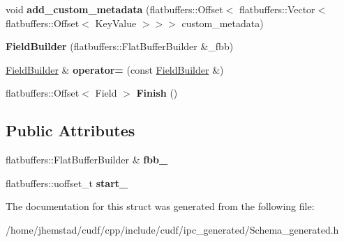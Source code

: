 \begin{DoxyCompactItemize}
\item 
void {\bfseries add\+\_\+custom\+\_\+metadata} (flatbuffers\+::\+Offset$<$ flatbuffers\+::\+Vector$<$ flatbuffers\+::\+Offset$<$ Key\+Value $>$$>$$>$ custom\+\_\+metadata)\hypertarget{structorg_1_1apache_1_1arrow_1_1flatbuf_1_1FieldBuilder_aab60afc5059e350c19c069a3e72563a3}{}\label{structorg_1_1apache_1_1arrow_1_1flatbuf_1_1FieldBuilder_aab60afc5059e350c19c069a3e72563a3}

\item 
{\bfseries Field\+Builder} (flatbuffers\+::\+Flat\+Buffer\+Builder \&\+\_\+fbb)\hypertarget{structorg_1_1apache_1_1arrow_1_1flatbuf_1_1FieldBuilder_acfb2eecaf9856b74b2bba5214c745767}{}\label{structorg_1_1apache_1_1arrow_1_1flatbuf_1_1FieldBuilder_acfb2eecaf9856b74b2bba5214c745767}

\item 
\hyperlink{structorg_1_1apache_1_1arrow_1_1flatbuf_1_1FieldBuilder}{Field\+Builder} \& {\bfseries operator=} (const \hyperlink{structorg_1_1apache_1_1arrow_1_1flatbuf_1_1FieldBuilder}{Field\+Builder} \&)\hypertarget{structorg_1_1apache_1_1arrow_1_1flatbuf_1_1FieldBuilder_a979b735cd740c5d157d0542afe1feda1}{}\label{structorg_1_1apache_1_1arrow_1_1flatbuf_1_1FieldBuilder_a979b735cd740c5d157d0542afe1feda1}

\item 
flatbuffers\+::\+Offset$<$ Field $>$ {\bfseries Finish} ()\hypertarget{structorg_1_1apache_1_1arrow_1_1flatbuf_1_1FieldBuilder_a9d2d6881f6a6503e56b90d4081a343b6}{}\label{structorg_1_1apache_1_1arrow_1_1flatbuf_1_1FieldBuilder_a9d2d6881f6a6503e56b90d4081a343b6}

\end{DoxyCompactItemize}
\subsection*{Public Attributes}
\begin{DoxyCompactItemize}
\item 
flatbuffers\+::\+Flat\+Buffer\+Builder \& {\bfseries fbb\+\_\+}\hypertarget{structorg_1_1apache_1_1arrow_1_1flatbuf_1_1FieldBuilder_ab62a8b9bbadfc44efd1c00cd7d95c93b}{}\label{structorg_1_1apache_1_1arrow_1_1flatbuf_1_1FieldBuilder_ab62a8b9bbadfc44efd1c00cd7d95c93b}

\item 
flatbuffers\+::uoffset\+\_\+t {\bfseries start\+\_\+}\hypertarget{structorg_1_1apache_1_1arrow_1_1flatbuf_1_1FieldBuilder_a424c82f86ca8ff1710fa7226ff0d7233}{}\label{structorg_1_1apache_1_1arrow_1_1flatbuf_1_1FieldBuilder_a424c82f86ca8ff1710fa7226ff0d7233}

\end{DoxyCompactItemize}


The documentation for this struct was generated from the following file\+:\begin{DoxyCompactItemize}
\item 
/home/jhemstad/cudf/cpp/include/cudf/ipc\+\_\+generated/Schema\+\_\+generated.\+h\end{DoxyCompactItemize}
